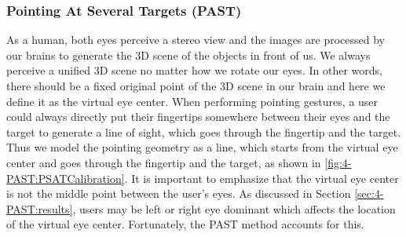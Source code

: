 \subsubsection{Pointing At Several Targets (PAST)} \label{sec:4-PAST:PAST}
As a human, both eyes perceive a stereo view and the images are processed by our brains to generate the 3D scene of the objects in front of us. We always perceive a unified 3D scene no matter how we rotate our eyes. In other words, there should be a fixed original point of the 3D scene in our brain and here we define it as the virtual eye center. When performing pointing gestures, a user could always directly put their fingertips somewhere between their eyes and the target to generate a line of sight, which goes through the fingertip and the target. Thus we model the pointing geometry as a line, which starts from the virtual eye center and goes through the fingertip and the target, as shown in \figurename{ \ref{fig:4-PAST:PSATCalibration}}. It is important to emphasize that the virtual eye center is not the middle point between the user's eyes. As discussed in Section \ref{sec:4-PAST:results}, users may be left or right eye dominant which affects the location of the virtual eye center. Fortunately, the PAST method accounts for this.

